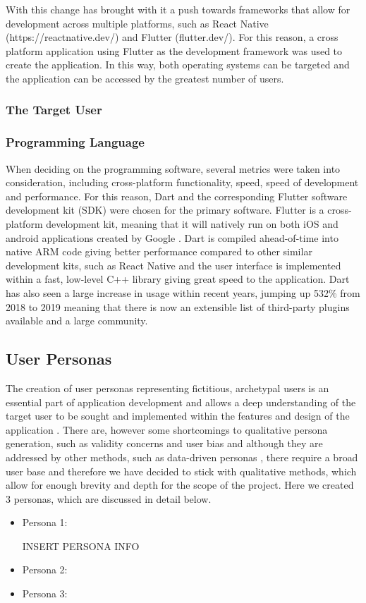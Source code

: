 \documentclass[12pt]{article}
\begin{document}
	With this change has brought with it a push towards frameworks that allow for development across multiple platforms, such as React Native (https://reactnative.dev/) and Flutter (flutter.dev/). For this reason, a cross platform application using Flutter as the development framework was used to create the application. In this way, both operating systems can be targeted and the application can be accessed by the greatest number of users.
	
	
	\subsubsection{The Target User}
	
	\subsubsection{Programming Language}
	When deciding on the programming software, several metrics were taken into consideration, including cross-platform functionality, speed, speed of development and performance. For this reason, Dart and the corresponding Flutter software development kit (SDK) were chosen for the primary software. Flutter is a cross-platform development kit, meaning that it will natively run on both iOS and android applications created by Google \cite{flutter}. Dart is compiled ahead-of-time into native ARM code giving better performance compared to other similar development kits, such as React Native and the user interface  is implemented within a fast, low-level C++ library giving great speed to the application. Dart has also seen a large increase in usage within recent years, jumping up 532\% from 2018 to 2019 \cite{Github, 2018} meaning that there is now an extensible list of third-party plugins available and a large community.
	

	\subsection{User Personas}
	The creation of user personas representing fictitious, archetypal users is an essential part of application development \cite{Grudin and Pruitt, 2002} and allows a deep understanding of the target user to be sought and implemented within the features and design of the application \cite{Long, 2009}. There are, however some shortcomings to qualitative persona generation, such as validity concerns and user bias \cite{Chapman and Milham, 2007} and although they are addressed by other methods, such as data-driven personas \cite{Mcginn and Kotamraju, 2008}, there require a broad user base and therefore we have decided to stick with qualitative methods, which allow for enough brevity and depth for the scope of the project. Here we created 3 personas, which are discussed in detail below.
	\begin{itemize}
		\item Persona 1: 
		
		INSERT PERSONA INFO
		\item Persona 2:
		\item Persona 3:
	\end{itemize}
\end{document}
